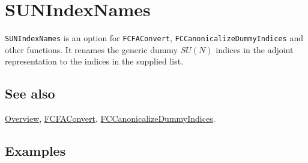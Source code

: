 \documentclass[../FeynCalcManual.tex]{subfiles}
\begin{document}
\hypertarget{sunindexnames}{%
\section{SUNIndexNames}\label{sunindexnames}}

\texttt{SUNIndexNames} is an option for \texttt{FCFAConvert},
\texttt{FCCanonicalizeDummyIndices} and other functions. It renames the
generic dummy \(SU(N)\) indices in the adjoint representation to the
indices in the supplied list.

\subsection{See also}

\hyperlink{toc}{Overview}, \hyperlink{fcfaconvert}{FCFAConvert},
\hyperlink{fccanonicalizedummyindices}{FCCanonicalizeDummyIndices}.

\subsection{Examples}
\end{document}
